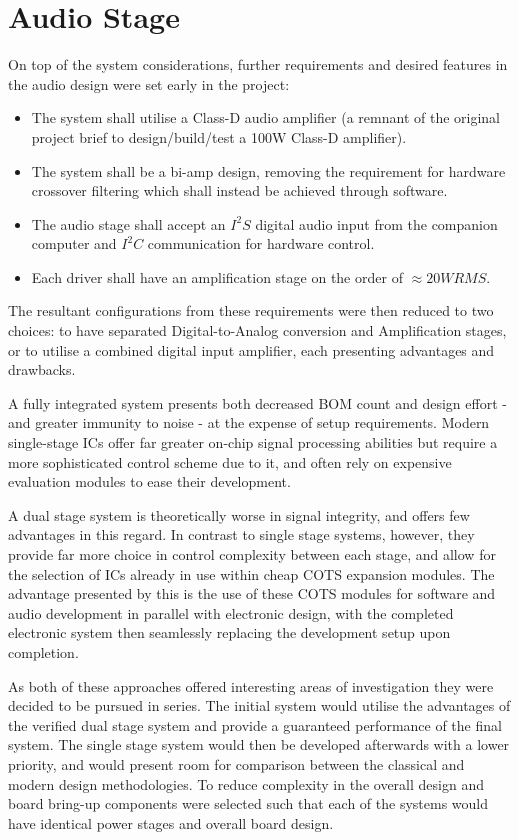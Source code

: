 \documentclass[main.tex]{subfiles}
\begin{document}
\section{Audio Stage}

On top of the system considerations, further requirements and desired features in the audio design were set early in the project:
\begin{itemize}
    \item The system shall utilise a Class-D audio amplifier (a remnant of the original project brief to design/build/test a 100W Class-D amplifier).
    \item The system shall be a bi-amp design, removing the requirement for hardware crossover filtering which shall instead be achieved through software. 
    \item The audio stage shall accept an $I^{2}S$ digital audio input from the companion computer and $I^{2}C$ communication for hardware control.
    \item Each driver shall have an amplification stage on the order of $\approx20W RMS$.
\end{itemize}

The resultant configurations from these requirements were then reduced to two choices: to have separated Digital-to-Analog conversion and Amplification stages, or to utilise a combined digital input amplifier, each presenting advantages and drawbacks.
\par
A fully integrated system presents both decreased BOM count and design effort - and greater immunity to noise - at the expense of setup requirements. Modern single-stage ICs offer far greater on-chip signal processing abilities but require a more sophisticated control scheme due to it, and often rely on expensive evaluation modules to ease their development. 
\par
A dual stage system is theoretically worse in signal integrity, and offers few advantages in this regard. In contrast to single stage systems, however, they provide far more choice in control complexity between each stage, and allow for the selection of ICs already in use within cheap COTS expansion modules. The advantage presented by this is the use of these COTS modules for software and audio development in parallel with electronic design, with the completed electronic system then seamlessly replacing the development setup upon completion.
\par
As both of these approaches offered interesting areas of investigation they were decided to be pursued in series. The initial system would utilise the advantages of the verified dual stage system and provide a guaranteed performance of the final system. The single stage system would then be developed afterwards with a lower priority, and would present room for comparison between the classical and modern design methodologies. To reduce complexity in the overall design and board bring-up components were selected such that each of the systems would have identical power stages and overall board design.
\end{document}
